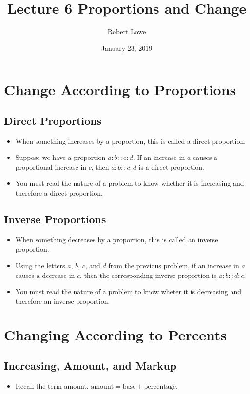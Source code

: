 \documentclass{article}
\title{Lecture 6 Proportions and Change}
\author{Robert Lowe}
\date{January 23, 2019}
\begin{document}
\maketitle

\section*{Change According to Proportions}
\subsection*{Direct Proportions}
\begin{itemize}
\item When something increases by a proportion, this is called a direct proportion.
\item Suppose we have a proportion $a:b :: c:d$.  If an increase in $a$ causes a proportional increase in $c$, then $a:b :: c:d$ is a direct proportion.  
\item You must read the nature of a problem to know whether it is increasing and therefore a direct proportion.
\end{itemize}

\subsection*{Inverse Proportions}
\begin{itemize}
\item When something decreases by a proportion, this is called an inverse proportion.
\item Using the letters $a$, $b$, $c$, and $d$ from the previous problem, if an increase in $a$ causes a decrease in $c$, then the corresponding inverse proportion is $a:b :: d:c$.
\item You must read the nature of a problem to know wheter it is decreasing and therefore an inverse proportion.
\end{itemize}

\section*{Changing According to Percents}
\subsection*{Increasing, Amount, and Markup}
\begin{itemize}
\item Recall the term amount.  $\mathrm{amount} = \mathrm{base} + \mathrm{percentage}$.
\end{itemize}
\end{document}
